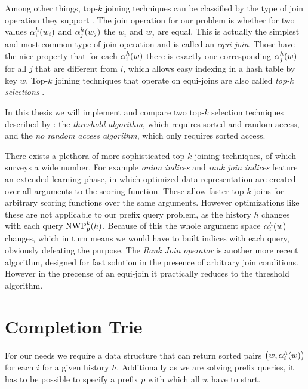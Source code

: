 Among other things, top-$k$ joining techniques can be classified by the type
of join operation they support \parencite{Ilyas2008}.
The join operation for our problem is whether for two values $\alpha^h_i(w_i)$
and $\alpha^h_j(w_j)$ the $w_i$ and $w_j$ are equal.
This is actually the simplest and most common type of join operation and is
called an \emph{equi-join}.
Those have the nice property that for each $\alpha^h_i(w)$ there is exactly one
corresponding $\alpha^h_j(w)$ for all $j$ that are different from $i$, which
allows easy indexing in a hash table by key $w$.
Top-$k$ joining techniques that operate on equi-joins are also called
\emph{top-$k$ selections} \parencite{Ilyas2008}.

In this thesis we will implement and compare two top-$k$ selection techniques
described by \textcite{Fagin2001}: the \emph{threshold algorithm}, which
requires sorted and random access, and the \emph{no random access algorithm},
which only requires sorted access.

There exists a plethora of more sophisticated top-$k$ joining techniques, of
which \textcite{Ilyas2008} surveys a wide number.
For example \emph{onion indices} \parencite{Chang2000} and
\emph{rank join indices} \parencite{Tsaparas2003} feature an extended learning
phase, in which optimized data representation are created over all arguments to
the scoring function.
These allow faster top-$k$ joins for arbitrary scoring functions over the same
arguments.
However optimizations like these are not applicable to our prefix query problem,
as the history $h$ changes with each query $\NWP[p][k](h)$.
Because of this the whole argument space $\alpha^h_i(w)$ changes, which in turn
means we would have to built indices with each query, obviously defeating the
purpose.
The \emph{Rank Join operator} \parencite{Ilyas2004} is another more recent
algorithm, designed for fast solution in the presence of arbitrary join
conditions.
However in the precense of an equi-join it practically reduces to the threshold
algorithm.

\section{Completion Trie}
\label{sec:completiontrie}

For our needs we require a data structure that can return sorted pairs
$\left(w, \alpha^h_i(w)\right)$ for each $i$ for a given history $h$.
Additionally as we are solving prefix queries, it has to be possible to specify
a prefix $p$ with which all $w$ have to start.


